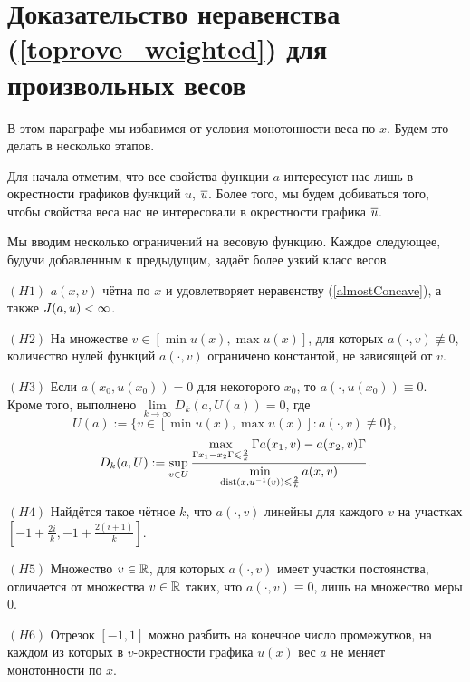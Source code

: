 \section{Доказательство неравенства (\ref{toprove_weighted}) для произвольных весов}
\label{moveForth}

В этом параграфе мы избавимся от условия монотонности веса по $x$.
Будем это делать в несколько этапов.

Для начала отметим, что все свойства функции $a$ интересуют нас лишь в окрестности графиков функций $u$, $\mon{u}$.
Более того, мы будем добиваться того, чтобы свойства веса нас не интересовали в окрестности графика $\mon{u}$.

Мы вводим несколько ограничений на весовую функцию.
Каждое следующее, будучи добавленным к предыдущим, задаёт более узкий класс весов. 

\bigskip

\smallskip
\noindent
$(H1)$ $a(x, v)$ чётна по $x$ и удовлетворяет неравенству (\ref{almostConcave}), а также $J(a, u) < \infty$.
\smallskip

\bigskip
\noindent
$(H2)$ На множестве $v \in [\min u(x), \max u(x)]$, для которых $a(\cdot, v) \not\equiv 0$,
количество нулей функций $a(\cdot, v)$ ограничено константой, не зависящей от $v$.

\bigskip
\noindent
$(H3)$ Если $a(x_0, u(x_0)) = 0$ для некоторого $x_0$, то $a(\cdot, u(x_0)) \equiv 0$.
Кроме того, выполнено $\lim\limits_{k \to \infty} D_k(a, U(a)) = 0$, где
$$
U(a) := \{ v \in [\min u(x), \max u(x)]: a(\cdot, v) \not \equiv 0 \},
$$
\begin{equation}
\label{bigD}
D_k(a, U) := \sup \limits_{v \in U}
\frac{\max \limits_{\abs{x_1 - x_2} \le \frac{2}{k}} \abs{a(x_1, v) - a(x_2, v)}}
{\min \limits_{\dist (x, u^{-1} (v)) \le \frac{2}{k}} a(x, v)}.
\end{equation}

\bigskip
\noindent
$(H4)$ Найдётся такое чётное $k$, что $a(\cdot, v)$ линейны для каждого $v$ на участках
$[-1 + \frac{2i}{k}, -1 + \frac{2(i + 1)}{k}]$.

\bigskip
\noindent
$(H5)$ Множество $v \in \mathbb R$, для которых $a(\cdot, v)$ имеет участки постоянства,
отличается от множества $v \in \mathbb R$ таких, что $a(\cdot, v) \equiv 0$,
лишь на множество меры $0$.

\bigskip
\noindent
$(H6)$ Отрезок $[-1, 1]$ можно разбить на конечное число промежутков,
на каждом из которых в $v$-окрестности графика $u(x)$ вес $a$ не меняет монотонности по $x$.

